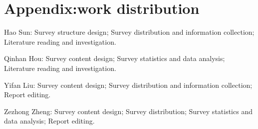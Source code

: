 \documentclass[conference]{IEEEtran}
\begin{document}
\section{Appendix:work distribution}
\par Hao Sun: Survey structure design; Survey distribution and information collection; Literature reading and investigation.
\par Qinhan Hou: Survey content design; Survey statistics and data analysis; Literature reading and investigation.
\par Yifan Liu: Survey content design; Survey distribution and information collection; Report editing.
\par Zezhong Zheng: Survey content design; Survey distribution; Survey statistics and data analysis; Report editing.
\end{document}
